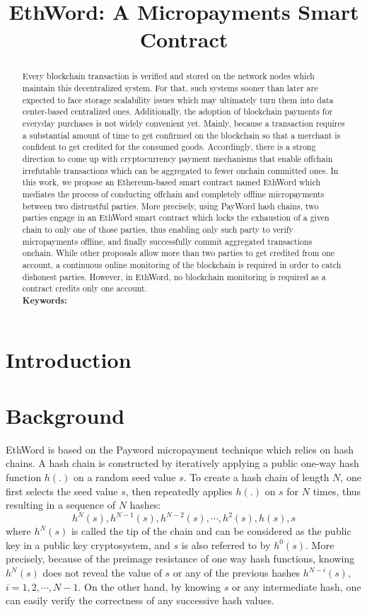 \documentclass{llncs}
\newcommand{\ethword}{{\sf EthWord}{}}
\begin{document}
\sloppy
\title{EthWord: A Micropayments Smart Contract}
\author{}
\institute{}
\maketitle{}
\setcounter{page}{1}
\pagestyle{plain}
\begin{abstract}
Every blockchain transaction is verified and stored on the network nodes which maintain this decentralized system. For that, such systems sooner than later are expected to face storage scalability issues which may ultimately turn them into data center-based centralized ones. Additionally, the adoption of blockchain payments for everyday purchases is not widely convenient yet. Mainly, because a transaction requires a substantial amount of time to get confirmed on the blockchain so that a merchant is confident to get credited for the consumed goods. Accordingly, there is a strong direction to come up with cryptocurrency payment mechanisms that enable offchain irrefutable transactions which can be aggregated to fewer onchain committed ones. In this work, we propose an Ethereum-based smart contract named \ethword{} which mediates the process of conducting offchain and completely offline micropayments between two distrustful parties. More precisely, using PayWord hash chains, two parties engage in an \ethword{} smart contract which locks the exhaustion of a given chain to only one of those parties, thus enabling only such party to verify micropayments offline, and finally successfully commit aggregated transactions onchain. While other proposals allow more than two parties to get credited from one account, a continuous online monitoring of the blockchain is required in order to catch dishonest parties. However, in \ethword, no blockchain monitoring is required as a contract credits only one account.    
\\  
\textbf{Keywords:}
\end{abstract}
\section{Introduction}
\section{Background}
\ethword{} is based on the Payword micropayment technique \cite{} which relies on hash chains. A hash chain is constructed by iteratively applying a public one-way hash function $h(.)$ on a random seed value $s$. To create a hash chain of length $N$, one first selects the seed value $s$, then repeatedly applies $h(.)$ on $s$ for $N$ times, thus resulting in a sequence of $N$ hashes:
\[
h^N(s), h^{N-1}(s), h^{N-2}(s), \cdots, h^2(s), h(s),s  
\]
where $h^N(s)$ is called the tip of the chain and can be considered as the public key in a public key cryptosystem, and $s$ is also referred to by $h^0(s)$. More precisely, because of the preimage resistance of one way hash functions, knowing $h^N(s)$ does not reveal the value of $s$ or any of the previous hashes $h^{N-i}(s)$, $i=1,2,\cdots,N-1$. On the other hand, by knowing $s$ or any intermediate hash, one can easily verify the correctness of any successive hash values.
\end{document}
